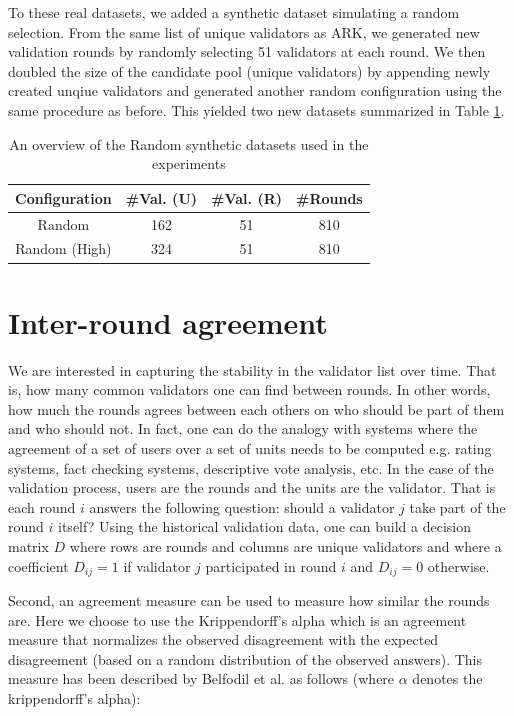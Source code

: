 \documentclass{article}
\begin{document}
To these real datasets, we added a synthetic dataset simulating a random selection. From the same list of unique validators as ARK, we generated new validation rounds by randomly selecting 51 validators at each round. We then doubled the size of the candidate pool (unique validators) by appending newly created unqiue validators and generated another random configuration using the same procedure as before. This yielded two new datasets summarized in Table \ref{tab:dataR}.

\begin{table}[]
\centering
 \begin{tabular}{|c c c c|} 
 \hline
 Configuration & \#Val. (U) & \#Val. (R) & \#Rounds   \\ [0.5ex] 
 \hline\hline 
 Random & 162 & 51 & 810 \\ [1ex] 
 Random (High) & 324 & 51 & 810  \\ [1ex] 
 \hline
 \end{tabular}
  
 \caption{An overview of the Random synthetic datasets used in the experiments}
 \label{tab:dataR}
\end{table}

\section{Inter-round agreement}
\label{sec:agreement}
We are interested in capturing the stability in the validator list over time. That is, how many common validators one can find between rounds. In other words, how much the rounds agrees between each others on who should be part of them and who should not. In fact, one can do the analogy with systems where the agreement of a set of users over a set of units needs to be computed e.g. rating systems, fact checking systems, descriptive vote analysis, etc. In the case of the validation process, users are the rounds and the units are the validator. That is each round $i$ answers the following question: should a validator $j$ take part of the round $i$ itself? Using the historical validation data, one can build a decision matrix $D$ where rows are rounds and columns are unique validators and where a coefficient $D_{ij} = 1$ if validator $j$ participated in round $i$ and $D_{ij} =0$ otherwise. 

Second, an agreement measure can be used to measure how similar the rounds are. Here we choose to use the Krippendorff's alpha \cite{krippendorff2018content} which is an agreement measure that normalizes the observed disagreement with the expected disagreement (based on a random distribution of the observed answers). This measure has been described by Belfodil et al. \cite{belfodil2019dEV} as follows (where $\alpha$ denotes the krippendorff's alpha): 
\end{document}
